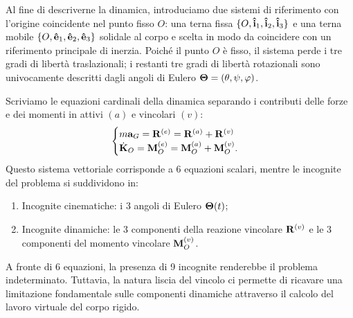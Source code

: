 Al fine di descriverne la dinamica, introduciamo due sistemi di riferimento con l'origine coincidente nel punto fisso $O$: una terna fissa $\{O, \vu{i}_1, \vu{i}_2, \vu{i}_3\}$ e una terna mobile $\{O, \vu{e}_1, \vu{e}_2, \vu{e}_3\}$ solidale al corpo e scelta in modo da coincidere con un riferimento principale di inerzia. Poiché il punto $O$ è fisso, il sistema perde i tre gradi di libertà traslazionali; i restanti tre gradi di libertà rotazionali sono univocamente descritti dagli angoli di Eulero $\vb{\Theta}=(\theta, \psi, \varphi)$.

Scriviamo le equazioni cardinali della dinamica separando i contributi delle forze e dei momenti in attivi $(a)$ e vincolari $(v)$:
\begin{equation*}
    \begin{cases}
        m\vb{a}_G = \vb{R}^{(e)} = \vb{R}^{(a)} + \vb{R}^{(v)} \\
        \dot{\vb{K}}_O = \vb{M}_O^{(e)} = \vb{M}_O^{(a)} + \vb{M}_O^{(v)}.
    \end{cases}
\end{equation*}
Questo sistema vettoriale corrisponde a 6 equazioni scalari, mentre le incognite del problema si suddividono in:
\begin{enumerate}[label=$\roman*.$]
    \item Incognite cinematiche: i 3 angoli di Eulero $\vb{\Theta}(t)$;
    \item Incognite dinamiche: le 3 componenti della reazione vincolare $\vb{R}^{(v)}$ e le 3 componenti del momento vincolare $\vb{M}_O^{(v)}$.
\end{enumerate}
A fronte di 6 equazioni, la presenza di 9 incognite renderebbe il problema indeterminato. Tuttavia, la natura liscia del vincolo ci permette di ricavare una limitazione fondamentale sulle componenti dinamiche attraverso il calcolo del lavoro virtuale del corpo rigido.

